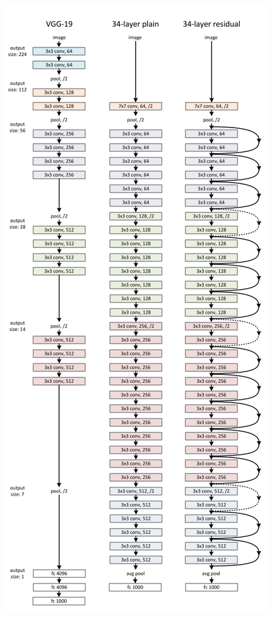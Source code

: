 \documentclass{beamer}
\begin{document}
\begin{frame}
\begin{columns}
\begin{column}{0.5\textwidth}
		\includegraphics[height=0.85\textheight]{images/resnet_imagenet.png}
	\end{column}
\end{columns}
\end{frame}
\end{document}
